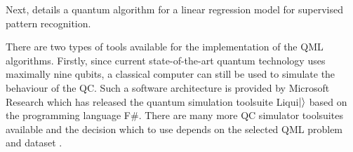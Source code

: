 \documentclass[a4paper]{article}
\newcommand*{\0}{$\ket{0}$}
\newcommand*{\1}{$\ket{1}$}
\begin{document}
Next, \cite{Schuld2016} details a quantum algorithm for a linear regression model for supervised pattern recognition. 

There are two types of tools available for the implementation of the QML algorithms. Firstly, since current state-of-the-art quantum technology uses maximally nine qubits, a classical computer can still be used to simulate the behaviour of the QC. Such a software architecture is provided by Microsoft Research which has released the quantum simulation toolsuite Liqui$\ket{}$ based on the programming language F\#. There are many more QC simulator toolsuites available and the decision which to use depends on the selected QML problem and dataset \citep{quantiki}.
\end{document}
